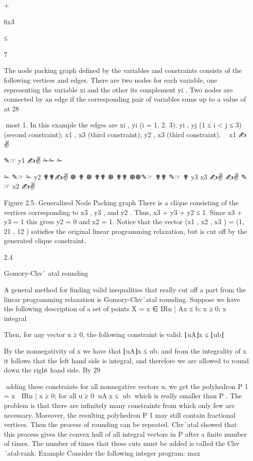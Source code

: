 \documentclass[titlepage]{book}
\theoremstyle{definition}
\begin{document}
+

6x3

≤

7

The node packing graph defined by the variables and constraints consists of the following vertices and
edges. There are two nodes for each variable, one representing the variable xi and the other its complement
yi . Two nodes are connected by an edge if the corresponding pair of variables sums up to a value of at
28

most 1. In this example the edges are {xi , yi } (i = 1, 2, 3); {yi , yj } (1 ≤ i < j ≤ 3) (second constraint);
{x1 , x3 } (third constraint); {y2 , x3 } (third constraint).
✎☞
x1
✍✌

✎☞
y1
✍✌
✁✁
✁

✁
✎☞
✁
y2
✟✟✍✌
❆
✟
❆
✟✟
❆
✟✟
❆❆✎☞
✟✟
✎☞
✟
y3
x3
✍✌
✍✌
✎☞
x2
✍✌

Figure 2.5: Generalized Node Packing graph
There is a clique consisting of the vertices corresponding to x3 , y3 , and y2 . Thus, x3 + y3 + y2 ≤ 1. Since
x3 + y3 = 1 this gives y2 = 0 and x2 = 1. Notice that the vector (x1 , x2 , x3 ) = (1, 21 , 12 ) satisfies the
original linear programming relaxation, but is cut off by the generated clique constraint.

2.4

Gomory-Chv´
atal rounding

A general method for finding valid inequalities that really cut off a part from the linear programming
relaxation is Gomory-Chv´atal rounding.
Suppose we have the following description of a set of points
X = {x ∈ IRn | Ax ≤ b; x ≥ 0; x integral}

Then, for any vector u ≥ 0, the following constraint is valid:
⌊uA⌋x ≤ ⌊ub⌋

By the nonnegativity of x we have that ⌊uA⌋x ≤ ub, and from the integrality of x it follows that
the left hand side is integral, and therefore we are allowed to round down the right hand side. By
29

adding these constraints for all nonnegative vectors u, we get the polyhedron P 1 = {x ∈ IRn | x ≥
0; for all u ≥ 0 ⌊uA⌋x ≤ ⌊ub⌋} which is really smaller than P . The problem is that there are infinitely
many constraints from which only few are necessary. Moreover, the resulting polyhedron P 1 may still
contain fractional vertices. Then the process of rounding can be repeated. Chv´atal showed that this
process gives the convex hull of all integral vectors in P after a finite number of times. The number of
times that these cuts must be added is called the Chv´atal-rank.
Example Consider the following integer program:
max
\end{document}
